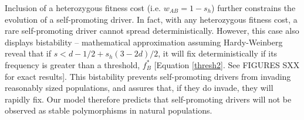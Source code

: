 \documentclass[12pt,letterpaper]{article}
\newcommand{\yb}[1]{{ \color{blue} #1}}
\begin{document}
Inclusion of a heterozygous fitness cost (i.e. $w_{AB}=1-s_h$)
further constrains the evolution of a self-promoting driver. 
In fact, with any heterozygous fitness cost, a rare self-promoting
driver cannot spread deterministically. 
However, this case also displays bistability -- 
	mathematical approximation assuming Hardy-Weinberg reveal that 
	if $s < d - 1/2+s_h(3-2d)/2$, it will fix deterministically if its 
	frequency is greater than a threshold, $f_B^*$ [Equation \eqref{thresh2}. 
	See \yb{FIGURES SXX} for exact results].
This bistability prevents self-promoting drivers from invading 	
	reasonably sized populations, and assures that, if they do invade, they will rapidly fix.
Our model therefore predicts that self-promoting drivers will not be
	observed as stable polymorphisms in natural populations. 
\end{document}
